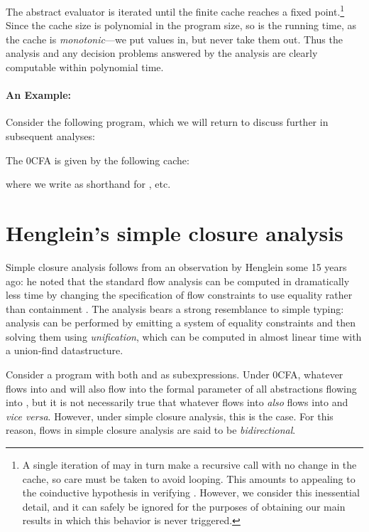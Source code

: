 \documentclass{llncs}
\begin{document}
The abstract evaluator  is iterated until the finite cache
reaches a fixed point.\footnote{\label{fn:fineprint}A single iteration
of  may in turn make a recursive call  with no change
in the cache, so care must be taken to avoid looping.  This amounts to
appealing to the coinductive hypothesis  in
verifying .  However, we consider this inessential
detail, and it can safely be ignored for the purposes of obtaining our
main results in which this behavior is never triggered.}  Since the
cache size is polynomial in the program size, so is the running time,
as the cache is {\em monotonic}---we put values in, but never take
them out.  Thus the analysis and any decision problems answered by the
analysis are clearly computable within polynomial time.

\paragraph{An Example:} 

Consider the following program, which we will return to discuss
further in subsequent analyses:



The 0CFA is given by the following cache:

where we write  as shorthand for , etc.


\section{Henglein's simple closure analysis}
\label{sec:simple}

Simple closure analysis follows from an observation by Henglein some
15 years ago: he noted that the standard flow analysis can be computed
in dramatically less time by changing the specification of flow
constraints to use equality rather than containment
\cite{henglein92d}.  The analysis bears a strong resemblance to simple
typing: analysis can be performed by emitting a system of equality
constraints and then solving them using {\em unification}, which can
be computed in almost linear time with a union-find datastructure.

Consider a program with both  and  as subexpressions.
Under 0CFA, whatever flows into  and  will also flow into the
formal parameter of all abstractions flowing into , but it is not
necessarily true that whatever flows into  {\em also} flows into
 and {\em vice versa}.  However, under simple closure analysis,
this is the case.  For this reason, flows in simple closure analysis
are said to be {\em bidirectional}.
\end{document}
